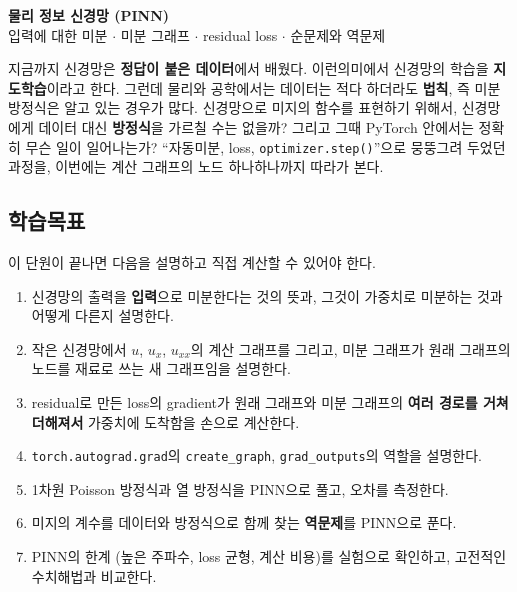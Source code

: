 \documentclass[11pt,a4paper]{article}
\begin{document}

\begin{center}
{\LARGE\bfseries 물리 정보 신경망 (PINN)}\\[0.35em]
{\large 입력에 대한 미분 $\cdot$ 미분 그래프 $\cdot$ residual loss $\cdot$ 순문제와 역문제}\\[0.8em]
\end{center}

\vspace{0.4em}

\begin{keybox}[이번 단원의 핵심 질문]
지금까지 신경망은 \textbf{정답이 붙은 데이터}에서 배웠다. 이런의미에서 신경망의 학습을 \textbf{지도학습}이라고 한다.
그런데 물리와 공학에서는 데이터는 적다 하더라도 \textbf{법칙}, 즉 미분방정식은 알고 있는 경우가 많다.
신경망으로 미지의 함수를 표현하기 위해서, 신경망에게 데이터 대신 \textbf{방정식}을 가르칠 수는 없을까?
그리고 그때 PyTorch 안에서는 정확히 무슨 일이 일어나는가?
``자동미분, loss, \texttt{optimizer.step()}''으로 뭉뚱그려 두었던 과정을, 이번에는 계산 그래프의 노드 하나하나까지 따라가 본다.
\end{keybox}

\subsection*{학습목표}

이 단원이 끝나면 다음을 설명하고 직접 계산할 수 있어야 한다.

\begin{enumerate}[label=\arabic*.]
\item 신경망의 출력을 \textbf{입력}으로 미분한다는 것의 뜻과, 그것이 가중치로 미분하는 것과 어떻게 다른지 설명한다.
\item 작은 신경망에서 $u$, $u_x$, $u_{xx}$의 계산 그래프를 그리고, 미분 그래프가 원래 그래프의 노드를 재료로 쓰는 새 그래프임을 설명한다.
\item residual로 만든 loss의 gradient가 원래 그래프와 미분 그래프의 \textbf{여러 경로를 거쳐 더해져서} 가중치에 도착함을 손으로 계산한다.
\item \texttt{torch.autograd.grad}의 \texttt{create\_graph}, \texttt{grad\_outputs}의 역할을 설명한다.
\item 1차원 Poisson 방정식과 열 방정식을 PINN으로 풀고, 오차를 측정한다.
\item 미지의 계수를 데이터와 방정식으로 함께 찾는 \textbf{역문제}를 PINN으로 푼다.
\item PINN의 한계 (높은 주파수, loss 균형, 계산 비용)를 실험으로 확인하고, 고전적인 수치해법과 비교한다.
\end{enumerate}
\end{document}
